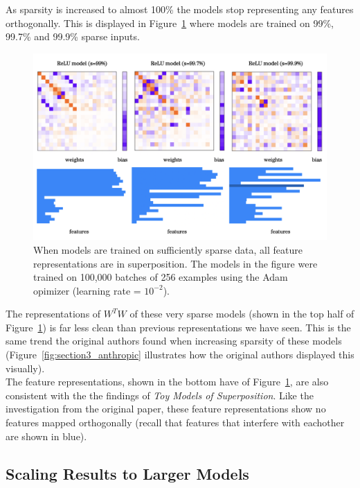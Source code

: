 \documentclass{article} %
\begin{document}
As sparsity is increased to almost 100\% the models stop representing any features
orthogonally. This is displayed in Figure~\ref{fig:sparsity_2} where models are
trained on 99\%, 99.7\% and 99.9\% sparse inputs.

\begin{figure}[h]
    \centering
    \includegraphics[width=0.75\linewidth]{demonstrating_superposition/images/sparsity_superposition2.png}
    \captionsetup{font=footnotesize, width=0.7\linewidth} %
    \caption{
        When models are trained on sufficiently sparse data, all feature
        representations are in superposition. The models in the figure were
        trained on 100,000 batches of 256 examples using the Adam opimizer 
        (learning rate = $10^{-2}$).
    }
    \label{fig:sparsity_2}
\end{figure}

The representations of $W^{T}W$ of these very sparse models (shown in the top
half of Figure~\ref{fig:sparsity_2}) is far less clean than previous
representations we have seen. This is the same trend the original authors
found when increasing sparsity of these models (Figure~\ref{fig:section3_anthropic}
illustrates how the original authors displayed this visually). \\

The feature representations, shown in the bottom have of Figure~\ref{fig:sparsity_2},
are also consistent with the the findings of \textit{Toy Models of Superposition}.
Like the investigation from the original paper, these feature representations 
show no features mapped orthogonally (recall that features that interfere with
eachother are shown in blue). \\

\subsection{Scaling Results to Larger Models}
\end{document}
